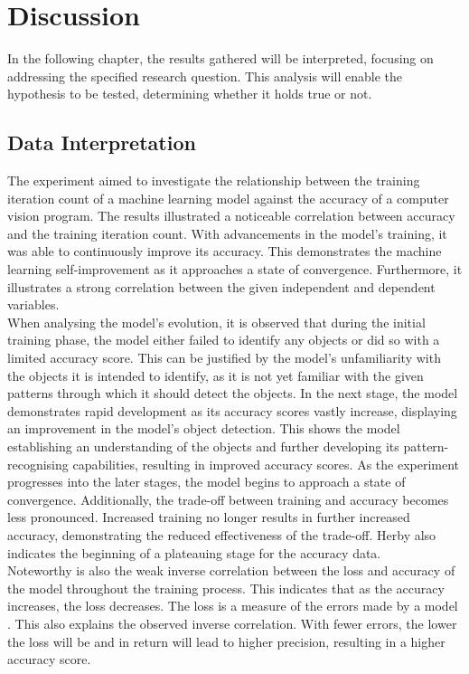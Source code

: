 \section{Discussion}
In the following chapter, the results gathered will be interpreted, focusing on addressing the specified research question. This analysis will enable the hypothesis to be tested, determining whether it holds true or not.


\subsection{Data Interpretation}

The experiment aimed to investigate the relationship between the training iteration count of a machine learning model against the accuracy of a computer vision program. The results illustrated a noticeable correlation between accuracy and the training iteration count. With advancements in the model's training, it was able to continuously improve its accuracy. This demonstrates the machine learning self-improvement as it approaches a state of convergence. Furthermore, it illustrates a strong correlation between the given independent and dependent variables.  \\

When analysing the model's evolution, it is observed that during the initial training phase, the model either failed to identify any objects or did so with a limited accuracy score. This can be justified by the model's unfamiliarity with the objects it is intended to identify, as it is not yet familiar with the given patterns through which it should detect the objects. In the next stage, the model demonstrates rapid development as its accuracy scores vastly increase, displaying an improvement in the model's object detection. This shows the model establishing an understanding of the objects and further developing its pattern-recognising capabilities, resulting in improved accuracy scores. As the experiment progresses into the later stages, the model begins to approach a state of convergence. Additionally, the trade-off between training and accuracy becomes less pronounced. Increased training no longer results in further increased accuracy, demonstrating the reduced effectiveness of the trade-off. Herby also indicates the beginning of a plateauing stage for the accuracy data.   \\ 

Noteworthy is also the weak inverse correlation between the loss and accuracy of the model throughout the training process. This indicates that as the accuracy increases, the loss decreases. The loss is a measure of the errors made by a model \parencite{Baeldung2022}. This also explains the observed inverse correlation. With fewer errors, the lower the loss will be and in return will lead to higher precision, resulting in a higher accuracy score.  \\

